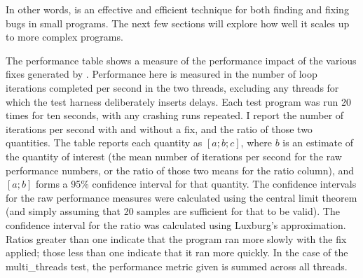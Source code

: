 In other words, {\technique} is an effective and efficient technique
for both finding and fixing bugs in small programs.  The next few
sections will explore how well it scales up to more complex programs.

The performance table shows a measure of the performance impact of the
various fixes generated by {\technique}.  Performance here is measured
in the number of loop iterations completed per second in the two
threads, excluding any threads for which the test harness deliberately
inserts delays.  Each test program was run 20 times for ten seconds,
with any crashing runs repeated.  I report the number of iterations
per second with and without a fix, and the ratio of those two
quantities.  The table reports each quantity as $[a; b; c]$, where $b$
is an estimate of the quantity of interest (the mean number of
iterations per second for the raw performance numbers, or the ratio of
those two means for the ratio column), and $[a;b]$ forms a 95\%
confidence interval for that quantity.  The confidence intervals for
the raw performance measures were calculated using the central limit
theorem (and simply assuming that 20 samples are sufficient for that
to be valid).  The confidence interval for the ratio was calculated
using Luxburg's approximation\needCite{}.  Ratios greater than one
indicate that the program ran more slowly with the fix applied; those
less than one indicate that it ran more quickly.  In the case of the
multi\_threads test, the performance metric given is summed across all
threads.



